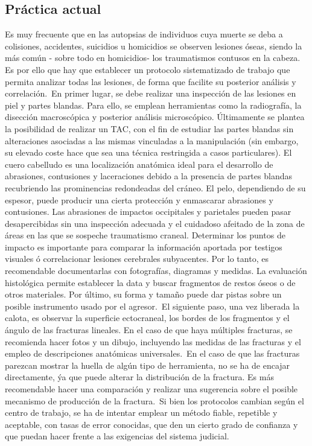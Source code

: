 \subsection{Práctica actual}
Es muy frecuente que en las autopsias de individuos cuya muerte se deba a colisiones, accidentes, suicidios u homicidios se observen lesiones óseas, siendo la más común - sobre todo en homicidios- los traumatismos contusos en la cabeza. Es por ello que hay que establecer un protocolo sistematizado de trabajo que permita analizar todas las lesiones, de forma que facilite su posterior análisis y correlación.\
En primer lugar, se debe realizar una inspección de las lesiones en piel y partes blandas. Para ello, se emplean herramientas como la radiografía, la disección macroscópica y posterior análisis microscópico. Últimamente se plantea la posibilidad de realizar un TAC, con el fin de estudiar las partes blandas sin alteraciones asociadas a las mismas vinculadas a la manipulación (sin embargo, su elevado coste hace que sea una técnica restringida a casos particulares). El cuero cabelludo es una localización anatómica ideal para el desarrollo de abrasiones, contusiones y laceraciones debido a la presencia de partes blandas recubriendo las prominencias redondeadas del cráneo. El pelo, dependiendo de su espesor, puede producir una cierta protección y enmascarar abrasiones y contusiones. Las abrasiones de impactos occipitales y parietales pueden pasar desapercibidas sin una inspección adecuada y el cuidadoso afeitado de la zona de áreas en las que se sospeche traumatismo craneal. Determinar los puntos de impacto es importante para comparar la información aportada por testigos visuales ó correlacionar lesiones cerebrales subyacentes. Por lo tanto, es recomendable documentarlas con fotografías, diagramas y medidas. La evaluación histológica permite establecer la data y buscar fragmentos de restos óseos o de otros materiales. Por último, su forma y tamaño puede dar pistas sobre un posible instrumento usado por el agresor.\
El siguiente paso, una vez liberada la calota, es observar la superficie ectocraneal, los bordes de los fragmentos y el ángulo de las fracturas lineales. En el caso de que haya múltiples fracturas, se recomienda hacer fotos y un dibujo, incluyendo las medidas de las fracturas y el empleo de descripciones anatómicas universales.\ 
En el caso de que las fracturas parezcan mostrar la huella de algún tipo de herramienta, no se ha de encajar directamente, ýa que puede alterar la distribución de la fractura. Es más recomendable hacer una comparación y realizar una sugerencia sobre el posible mecanismo de producción de la fractura.\
Si bien los protocolos cambian según el centro de trabajo, se ha de intentar emplear un método fiable, repetible y aceptable, con tasas de error conocidas, que den un cierto grado de confianza y que puedan hacer frente a las exigencias del sistema judicial.\
